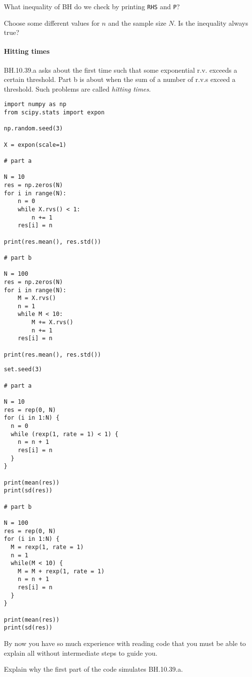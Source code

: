 \documentclass[assignments]{subfiles}
\begin{document}
\begin{exercise}
What inequality of BH do we check by printing \texttt{RHS}  and \texttt{P}?
\end{exercise}

\begin{exercise}
Choose some different values for $n$ and the sample size $N$. Is the inequality always true?
\end{exercise}


\paragraph{Hitting times} BH.10.39.a asks about the first time such that some exponential r.v.
exceeds a certain threshold.
Part b is about when the sum of a number of r.v.s exceed a threshold.
Such problems are called \emph{hitting times}.

\begin{verbatim}
import numpy as np
from scipy.stats import expon

np.random.seed(3)

X = expon(scale=1)

# part a

N = 10
res = np.zeros(N)
for i in range(N):
    n = 0
    while X.rvs() < 1:
        n += 1
    res[i] = n

print(res.mean(), res.std())

# part b

N = 100
res = np.zeros(N)
for i in range(N):
    M = X.rvs()
    n = 1
    while M < 10:
        M += X.rvs()
        n += 1
    res[i] = n

print(res.mean(), res.std())
\end{verbatim}

\begin{verbatim}
set.seed(3)

# part a

N = 10
res = rep(0, N)
for (i in 1:N) {
  n = 0
  while (rexp(1, rate = 1) < 1) {
    n = n + 1
    res[i] = n
  }
}

print(mean(res))
print(sd(res))

# part b

N = 100
res = rep(0, N)
for (i in 1:N) {
  M = rexp(1, rate = 1)
  n = 1
  while(M < 10) {
    M = M + rexp(1, rate = 1)
    n = n + 1
    res[i] = n
  }
}

print(mean(res))
print(sd(res))
\end{verbatim}


By now you have so much experience with reading code that you must be able to explain all without intermediate steps to guide you.
\begin{exercise}
Explain why the first part of the code simulates BH.10.39.a.
\end{exercise}
\end{document}
